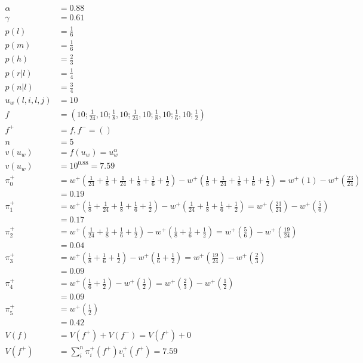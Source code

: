 \begin{equation*}
\begin{align*}
\alpha &= 0.88\\
\gamma &= 0.61\\
p(l) &= \frac{1}{6}\\
p(m) &= \frac{1}{6}\\
p(h) &= \frac{2}{3}\\
p(r | l) &= \frac{1}{4}\\
p(n | l) &= \frac{3}{4}\\
u_{w}(l, i, l, j) &= 10\\
f&=(10;\frac{1}{24},10;\frac{1}{8},10;\frac{1}{24},10;\frac{1}{8},10;\frac{1}{6},10;\frac{1}{2})\\
f^{+}&=f,f^{-}=()\\
n &= 5\\
v(u_{w}) &= f(u_{w}) = u_{w}^\alpha\\
v(u_{w}) &= 10^{0.88} = 7.59\\
\pi_{0}^{+}&=w^{+}(\frac{1}{24} + \frac{1}{8} + \frac{1}{24} + \frac{1}{8} + \frac{1}{6} + \frac{1}{2}) - w^{+}(\frac{1}{8} + \frac{1}{24} + \frac{1}{8} + \frac{1}{6} + \frac{1}{2})=w^{+}(1) - w^{+}(\frac{23}{24})\\
&=0.19\\
\pi_{1}^{+}&=w^{+}(\frac{1}{8} + \frac{1}{24} + \frac{1}{8} + \frac{1}{6} + \frac{1}{2}) - w^{+}(\frac{1}{24} + \frac{1}{8} + \frac{1}{6} + \frac{1}{2})=w^{+}(\frac{23}{24}) - w^{+}(\frac{5}{6})\\
&= 0.17\\
\pi_{2}^{+}&=w^{+}(\frac{1}{24} + \frac{1}{8} + \frac{1}{6} + \frac{1}{2}) - w^{+}(\frac{1}{8} + \frac{1}{6} + \frac{1}{2})=w^{+}(\frac{5}{6}) - w^{+}(\frac{19}{24})\\
&= 0.04\\
\pi_{3}^{+}&=w^{+}(\frac{1}{8} + \frac{1}{6} + \frac{1}{2}) - w^{+}(\frac{1}{6} + \frac{1}{2})=w^{+}(\frac{19}{24}) - w^{+}(\frac{2}{3})\\
&= 0.09\\
\pi_{4}^{+}&=w^{+}(\frac{1}{6} + \frac{1}{2}) - w^{+}(\frac{1}{2})=w^{+}(\frac{2}{3}) - w^{+}(\frac{1}{2})\\
&= 0.09\\
\pi_{5}^{+}&=w^{+}(\frac{1}{2})\\
&= 0.42\\
V(f) &= V(f^{+}) + V(f^{-}) = V(f^{+}) + 0\\
V(f^{+}) &= \sum_{i}^{n}\pi_{i}^{+}(f^{+})v_{i}^{+}(f^{+}) = 7.59
\end{align*}
\end{equation*}


